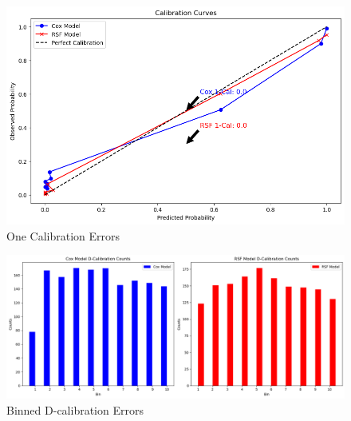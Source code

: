 \begin{figure}[h]
    \centering
    \includegraphics[scale=0.6]{Figures/SURV/calibration.png}
    \caption{One Calibration Errors}
    \label{fig:your_label}
\end{figure}

\begin{figure}[h]
    \centering
    \includegraphics[width=\linewidth]{Figures/SURV/binned_d_cal.png}
    \caption{Binned D-calibration Errors}
    \label{fig:your_label}
\end{figure}


